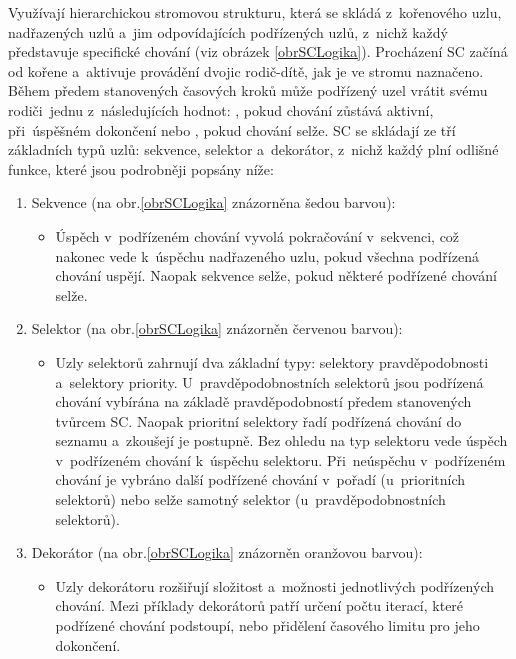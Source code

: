 Využívají hierarchickou stromovou strukturu, která se skládá z~kořenového uzlu, nadřazených uzlů a~jim odpovídajících podřízených uzlů, z~nichž každý představuje specifické chování (viz obrázek \ref{obrSCLogika}). Procházení SC začíná od kořene a~aktivuje provádění dvojic rodič-dítě, jak je ve stromu naznačeno. Během předem stanovených časových kroků může podřízený uzel vrátit svému rodiči~jednu z~následujících hodnot: , pokud chování zůstává aktivní,  při~úspěšném dokončení nebo , pokud chování selže. SC se skládají ze tří základních typů uzlů: sekvence, selektor a~dekorátor, z~nichž každý plní odlišné funkce, které jsou podrobněji popsány níže:
\begin{enumerate}
	\item Sekvence (na obr.\ref{obrSCLogika} znázorněna šedou barvou):
	\begin{itemize}
		\item Úspěch v~podřízeném chování vyvolá pokračování v~sekvenci, což nakonec vede k~úspěchu nadřazeného uzlu, pokud všechna podřízená chování uspějí. Naopak sekvence selže, pokud některé podřízené chování selže. 
	\end{itemize} 
	\item Selektor (na obr.\ref{obrSCLogika} znázorněn červenou barvou):
	\begin{itemize}
		\item Uzly selektorů zahrnují dva základní typy: selektory pravděpodobnosti a~selektory priority. U~pravděpodobnostních selektorů jsou podřízená chování vybírána na základě pravděpodobností předem stanovených tvůrcem SC. Naopak prioritní selektory řadí podřízená chování do seznamu a~zkoušejí je postupně. Bez ohledu na typ selektoru vede úspěch v~podřízeném chování k~úspěchu selektoru. Při~neúspěchu v~podřízeném chování je vybráno další podřízené chování v~pořadí (u~prioritních selektorů) nebo selže samotný selektor (u~pravděpodobnostních selektorů).
	\end{itemize} 
	\item Dekorátor (na obr.\ref{obrSCLogika} znázorněn oranžovou barvou):
	\begin{itemize}
		\item Uzly dekorátoru rozšiřují složitost a~možnosti jednotlivých podřízených chování. Mezi příklady dekorátorů patří určení počtu iterací, které podřízené chování podstoupí, nebo přidělení časového limitu pro jeho dokončení.
	\end{itemize} 
\end{enumerate}

